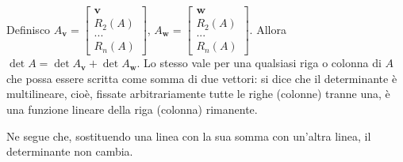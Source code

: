 \documentclass{article}
\begin{document}
\begin{enumerate}
Definisco $A_{\mathbf{v}}=\left[ 
\begin{array}{c}
\mathbf{v} \\ 
R_{2}\left( A\right) \\ 
... \\ 
R_{n}\left( A\right)%
\end{array}%
\right] $, $A_{\mathbf{w}}=\left[ 
\begin{array}{c}
\mathbf{w} \\ 
R_{2}\left( A\right) \\ 
... \\ 
R_{n}\left( A\right)%
\end{array}%
\right] $. Allora $\det A=\det A_{\mathbf{v}}+\det A_{\mathbf{w}}$. Lo
stesso vale per una qualsiasi riga o colonna di $A$ che possa essere scritta
come somma di due vettori: si dice che il determinante \`{e} multilineare,
cio\`{e}, fissate arbitrariamente tutte le righe (colonne) tranne una, \`{e}
una funzione lineare della riga (colonna) rimanente.

Ne segue che, sostituendo una linea con la sua somma con un'altra linea, il
determinante non cambia.


\end{enumerate}
\end{document}
